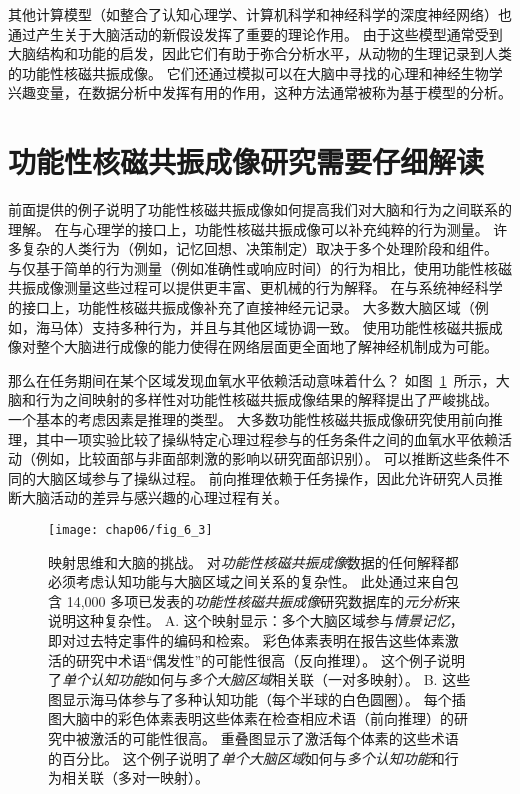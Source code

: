 其他计算模型（如整合了认知心理学、计算机科学和神经科学的深度神经网络）也通过产生关于大脑活动的新假设发挥了重要的理论作用。
由于这些模型通常受到大脑结构和功能的启发，因此它们有助于弥合分析水平，从动物的生理记录到人类的功能性核磁共振成像。 
它们还通过模拟可以在大脑中寻找的心理和神经生物学兴趣变量，在数据分析中发挥有用的作用，这种方法通常被称为基于模型的分析。



\section{功能性核磁共振成像研究需要仔细解读}

前面提供的例子说明了功能性核磁共振成像如何提高我们对大脑和行为之间联系的理解。
在与心理学的接口上，功能性核磁共振成像可以补充纯粹的行为测量。
许多复杂的人类行为（例如，记忆回想、决策制定）取决于多个处理阶段和组件。
与仅基于简单的行为测量（例如准确性或响应时间）的行为相比，使用功能性核磁共振成像测量这些过程可以提供更丰富、更机械的行为解释。
在与系统神经科学的接口上，功能性核磁共振成像补充了直接神经元记录。
大多数大脑区域（例如，海马体）支持多种行为，并且与其他区域协调一致。
使用功能性核磁共振成像对整个大脑进行成像的能力使得在网络层面更全面地了解神经机制成为可能。


那么在任务期间在某个区域发现血氧水平依赖活动意味着什么？
如图~\ref{fig:6_3}~所示，大脑和行为之间映射的多样性对功能性核磁共振成像结果的解释提出了严峻挑战。
一个基本的考虑因素是推理的类型。 
大多数功能性核磁共振成像研究使用前向推理，其中一项实验比较了操纵特定心理过程参与的任务条件之间的血氧水平依赖活动（例如，比较面部与非面部刺激的影响以研究面部识别）。
可以推断这些条件不同的大脑区域参与了操纵过程。
前向推理依赖于任务操作，因此允许研究人员推断大脑活动的差异与感兴趣的心理过程有关。


\begin{figure}[htbp]
	\centering
	\texttt{[image: chap06/fig\_6\_3]}
	\caption{映射思维和大脑的挑战。
		对\textit{功能性核磁共振成像}数据的任何解释都必须考虑认知功能与大脑区域之间关系的复杂性。
		此处通过来自包含 14,000 多项已发表的\textit{功能性核磁共振成像}研究数据库的\textit{元分析}来说明这种复杂性。
		A. 这个映射显示：多个大脑区域参与\textit{情景记忆}，即对过去特定事件的编码和检索。
		彩色体素表明在报告这些体素激活的研究中术语“偶发性”的可能性很高（反向推理）。
		这个例子说明了\textit{单个认知功能}如何与\textit{多个大脑区域}相关联（一对多映射）。
		B. 这些图显示海马体参与了多种认知功能（每个半球的白色圆圈）。 
		每个插图大脑中的彩色体素表明这些体素在检查相应术语（前向推理）的研究中被激活的可能性很高。
		重叠图显示了激活每个体素的这些术语的百分比。
		这个例子说明了\textit{单个大脑区域}如何与\textit{多个认知功能}和行为相关联（多对一映射）。}
	\label{fig:6_3}
\end{figure}


